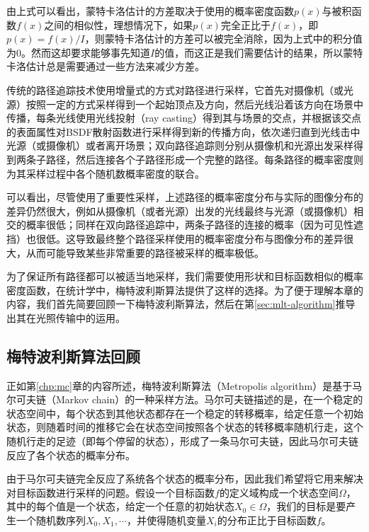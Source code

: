 由上式可以看出，蒙特卡洛估计的方差取决于使用的概率密度函数$p(x)$与被积函数$f(x)$之间的相似性，理想情况下，如果$p(x)$完全正比于$f(x)$，即$p(x)=f(x)/I$，则蒙特卡洛估计的方差可以被完全消除，因为上式中的积分值为0。然而这却要求能够事先知道$I$的值，而这正是我们需要估计的结果，所以蒙特卡洛估计总是需要通过一些方法来减少方差。

传统的路径追踪技术使用增量式的方式对路径进行采样，它首先对摄像机（或光源）按照一定的方式采样得到一个起始顶点及方向，然后光线沿着该方向在场景中传播，每条光线使用光线投射（ray casting）得到其与场景的交点，并根据该交点的表面属性对BSDF散射函数进行采样得到新的传播方向，依次递归直到光线击中光源（或摄像机）或者离开场景；双向路径追踪则分别从摄像机和光源出发采样得到两条子路径，然后连接各个子路径形成一个完整的路径。每条路径的概率密度则为其采样过程中各个随机数概率密度的联合。

可以看出，尽管使用了重要性采样，上述路径的概率密度分布与实际的图像分布的差异仍然很大，例如从摄像机（或者光源）出发的光线最终与光源（或摄像机）相交的概率很低；同样在双向路径追踪中，两条子路径的连接的概率（因为可见性遮挡）也很低。这导致最终整个路径采样使用的概率密度分布与图像分布的差异很大，从而可能导致某些非常重要的路径被采样的概率极低。

为了保证所有路径都可以被适当地采样，我们需要使用形状和目标函数相似的概率密度函数，在统计学中，梅特波利斯算法提供了这样的选择。为了便于理解本章的内容，我们首先简要回顾一下梅特波利斯算法，然后在第\ref{sec:mlt-algorithm}推导出其在光照传输中的运用。



\subsection{梅特波利斯算法回顾}
正如第\ref{chp:mc}章的内容所述，梅特波利斯算法（Metropolis algorithm）是基于马尔可夫链（Markov chain）的一种采样方法。马尔可夫链描述的是，在一个稳定的状态空间中，每个状态到其他状态都存在一个稳定的转移概率，给定任意一个初始状态，则随着时间的推移它会在状态空间按照各个状态的转移概率随机行走，这个随机行走的足迹（即每个停留的状态），形成了一条马尔可夫链，因此马尔可夫链反应了各个状态的概率分布。

由于马尔可夫链完全反应了系统各个状态的概率分布，因此我们希望将它用来解决对目标函数进行采样的问题。假设一个目标函数$f$的定义域构成一个状态空间$\Omega$，其中的每个值是一个状态，给定一个任意的初始状态$X_0\in\Omega$，我们的目标是要产生一个随机数序列$X_0,{X}_1,\cdots$，并使得随机变量${X}_i$的分布正比于目标函数$f$。


